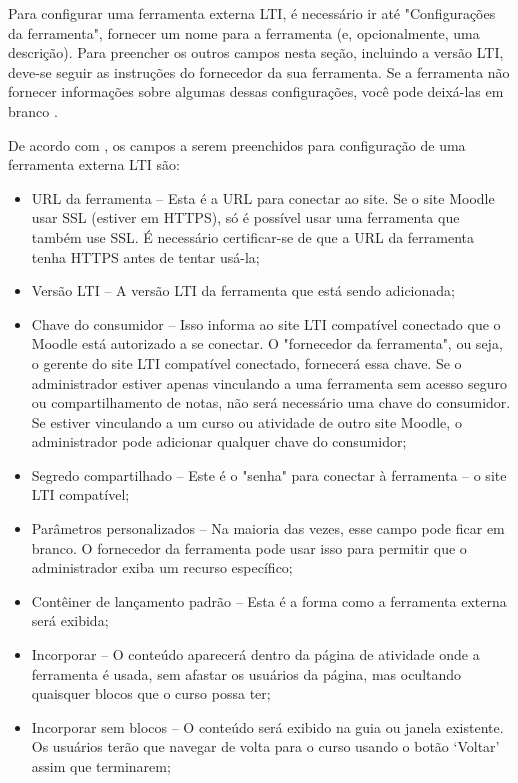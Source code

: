 Para configurar uma ferramenta externa LTI, é necessário ir até "Configurações da ferramenta", fornecer um nome para a ferramenta (e, opcionalmente, uma descrição). Para preencher os outros campos nesta seção, incluindo a versão LTI, deve-se seguir as instruções do fornecedor da sua ferramenta. Se a ferramenta não fornecer informações sobre algumas dessas configurações, você pode deixá-las em branco \cite{moodle}.

De acordo com \textcite{moodle}, os campos a serem preenchidos para configuração de uma ferramenta externa LTI são:

\begin{itemize}
    \item URL da ferramenta – Esta é a URL para conectar ao site. Se o site Moodle usar SSL (estiver em HTTPS), só é possível usar uma ferramenta que também use SSL. É necessário certificar-se de que a URL da ferramenta tenha HTTPS antes de tentar usá-la;
    \item Versão LTI – A versão LTI da ferramenta que está sendo adicionada; 
    \item Chave do consumidor – Isso informa ao site LTI compatível conectado que o Moodle está autorizado a se conectar. O "fornecedor da ferramenta", ou seja, o gerente do site LTI compatível conectado, fornecerá essa chave. Se o administrador estiver apenas vinculando a uma ferramenta sem acesso seguro ou compartilhamento de notas, não será necessário uma chave do consumidor. Se estiver vinculando a um curso ou atividade de outro site Moodle, o administrador pode adicionar qualquer chave do consumidor;
    \item Segredo compartilhado – Este é o "senha" para conectar à ferramenta – o site LTI compatível;
    \item Parâmetros personalizados – Na maioria das vezes, esse campo pode ficar em branco. O fornecedor da ferramenta pode usar isso para permitir que o administrador exiba um recurso específico;
    \item Contêiner de lançamento padrão – Esta é a forma como a ferramenta externa será exibida;
    \item Incorporar – O conteúdo aparecerá dentro da página de atividade onde a ferramenta é usada, sem afastar os usuários da página, mas ocultando quaisquer blocos que o curso possa ter;
    \item Incorporar sem blocos – O conteúdo será exibido na guia ou janela existente. Os usuários terão que navegar de volta para o curso usando o botão ‘Voltar’ assim que terminarem;

\end{itemize}
